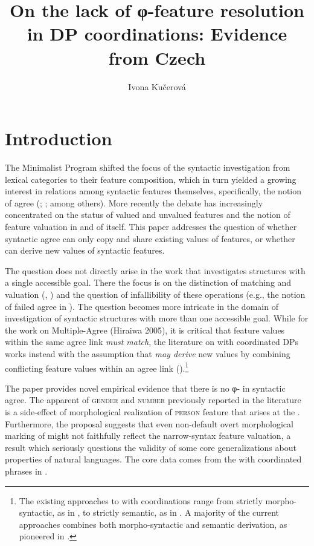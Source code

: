 \documentclass[output=paper,modfontsnewtxmath,hidelinks]{langscibook}
\title{On the lack of φ-feature resolution in DP coordinations: Evidence from Czech}
\author{ Ivona Kučerová\affiliation{McMaster University}}
\begin{document}
\qtreecenterfalse
{}
\maketitle

\section{Introduction}

The Minimalist Program \citep{Chomsky1995} shifted the focus of the syntactic investigation from lexical categories to their feature composition, which in turn yielded a growing interest in relations among syntactic features themselves, specifically, the notion of agree (\citealt{Chomsky2000}; \citealt{Chomsky2001}; among others). More recently the debate has increasingly concentrated on the status of valued and unvalued features \citep{pestorrego07} and the notion of feature valuation in and of itself. This paper addresses the question of whether syntactic agree can only copy and share existing values of features, or whether  can derive new values of syntactic features.

The question does not directly arise in the work that investigates structures with a single accessible goal. There the focus is on the distinction of matching and valuation (\citealt{bejarrezac03}, \citealt{pestorrego07}) and the question of infallibility of these operations (e.g., the notion of failed agree in \citealt{Preminger2009}). The question becomes more intricate in the domain of investigation of syntactic structures with more than one accessible goal. While for the work on Multiple-Agree (Hiraiwa 2005), it is critical that feature values within the same agree link \emph{must match}, the literature on  with coordinated DPs works instead with the assumption that  \emph{may derive} new values by combining conflicting feature values within an agree link (\citealt{Farkas1995,King2004,Heycock2005,Marusic2015}).\footnote{The existing approaches to  with coordinations range from strictly morpho-syntactic, as in \citet{Marusic2015}, to strictly semantic, as in \citet{Lasersohn1995}. A majority of the current approaches combines both morpho-syntactic and semantic derivation, as pioneered in \citet{Farkas1995}.}

The paper provides novel empirical evidence that there is no φ- in syntactic agree. The apparent  of \textsc{gender} and \textsc{number}  previously reported in the literature is a side-effect of morphological realization of \textsc{person} feature that arises at the . Furthermore, the proposal suggests that even non-default overt morphological marking of  might not faithfully reflect the narrow-syntax feature valuation, a result which seriously questions the validity of some core generalizations about  properties of natural languages. The core data comes from the  with coordinated  phrases in .
\end{document}
